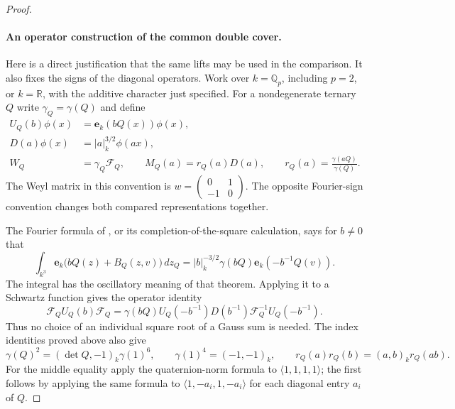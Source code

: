 \documentclass[11pt]{article}
\theoremstyle{definition}
\theoremstyle{remark}
\begin{document}
\begin{proof}
\paragraph{An operator construction of the common double cover.}
Here is a direct justification that the same lifts may be used in
the comparison. It also fixes the signs of the diagonal operators.
Work over $k=\mathbb Q_p$, including $p=2$, or $k=\mathbb R$,
with the additive character just specified. For a nondegenerate
ternary $Q$ write $\gamma_Q=\gamma(Q)$ and define
\[
 \begin{split}
 U_Q(b)\phi(x)&=\mathbf e_k(bQ(x))\phi(x),\\
 D(a)\phi(x)&=|a|_k^{3/2}\phi(ax),\\
 W_Q&=\gamma_Q\mathcal F_Q,\qquad
 M_Q(a)=r_Q(a)D(a),\qquad
 r_Q(a)=\frac{\gamma(aQ)}{\gamma(Q)}.
 \end{split}
\]
The Weyl matrix in this convention is
$w=\left(\begin{smallmatrix}0&1\\-1&0\end{smallmatrix}\right)$.
The opposite Fourier-sign convention changes both compared
representations together.

The Fourier formula of \cite[I.14, Theorem~2]{weil}, or its
completion-of-the-square calculation, says for $b\ne0$ that
\[
 \int_{k^3}
 \mathbf e_k\bigl(bQ(z)+B_Q(z,v)\bigr)\,dz_Q
   =|b|_k^{-3/2}\gamma(bQ)\mathbf e_k(-b^{-1}Q(v)).
\]
The integral has the oscillatory meaning of that theorem.
Applying it to a Schwartz function gives the operator identity
\[
 \mathcal F_Q U_Q(b)\mathcal F_Q
 =\gamma(bQ)U_Q(-b^{-1})D(b^{-1})
                   \mathcal F_Q^{-1}U_Q(-b^{-1}).
\]
Thus no choice of an individual square root of a Gauss sum is
needed. The index identities proved above also give
\[
 \gamma(Q)^2=(\det Q,-1)_k\gamma(1)^6,
 \qquad \gamma(1)^4=(-1,-1)_k,
 \qquad r_Q(a)r_Q(b)=(a,b)_k r_Q(ab).
\]
For the middle equality apply the quaternion-norm formula to
$\langle1,1,1,1\rangle$; the first follows by applying the same
formula to $\langle1,-a_i,1,-a_i\rangle$ for each diagonal
entry $a_i$ of $Q$.


\end{proof}
\end{document}
